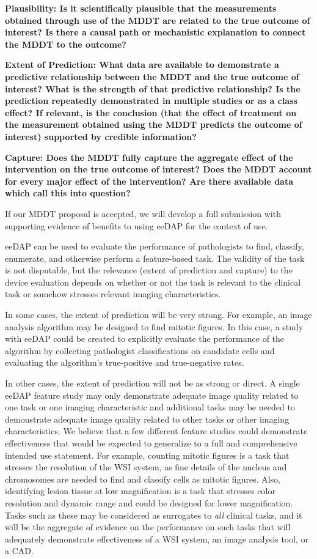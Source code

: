 \documentclass{article}%
\begin{document}
\textbf{Plausibility: Is it scientifically plausible that the measurements
obtained through use of the MDDT are related to the true outcome of interest?
Is there a causal path or mechanistic explanation to connect the MDDT to the
outcome?}

\textbf{Extent of Prediction: What data are available to demonstrate a
predictive relationship between the MDDT and the true outcome of interest?
What is the strength of that predictive relationship? Is the prediction
repeatedly demonstrated in multiple studies or as a class effect? If relevant,
is the conclusion (that the effect of treatment on the measurement obtained
using the MDDT predicts the outcome of interest) supported by credible
information?}

\textbf{Capture: Does the MDDT fully capture the aggregate effect of the
intervention on the true outcome of interest? Does the MDDT account for every
major effect of the intervention? Are there available data which call this
into question?}

If our MDDT proposal is accepted, we will develop a full submission with
supporting evidence of benefits to using eeDAP for the context of use.

eeDAP can be used to evaluate the performance of pathologists to find,
classify, enumerate, and otherwise perform a feature-based task. The validity
of the task is not disputable, but the relevance (extent of prediction and
capture) to the device evaluation depends on whether or not the task is
relevant to the clinical task or somehow stresses relevant imaging characteristics.

In some cases, the extent of prediction will be very strong. For example, an
image analysis algorithm may be designed to find mitotic figures. In this
case, a study with eeDAP could be created to explicitly evaluate the
performance of the algorithm by collecting pathologist classifications on
candidate cells and evaluating the algorithm's true-positive and true-negative rates.

In other cases, the extent of prediction will not be as strong or direct. A
single eeDAP feature study may only demonstrate adequate image quality related
to one task or one imaging characteristic and additional tasks may be needed
to demonstrate adequate image quality related to other tasks or other imaging
characteristics. We believe that a few different feature studies could
demonstrate effectiveness that would be expected to generalize to a full and
comprehensive intended use statement. For example, counting mitotic figures is
a task that stresses the resolution of the WSI system, as fine details of the
nucleus and chromosomes are needed to find and classify cells as mitotic
figures. Also, identifying lesion tissue at low magnification is a task that
stresses color resolution and dynamic range and could be designed for lower
magnification. Tasks such as these may be considered as surrogates to
\emph{all} clinical tasks, and it will be the aggregate of evidence on the
performance on such tasks that will adequately demonstrate effectiveness of a
WSI system, an image analysis tool, or a CAD.
\end{document}
